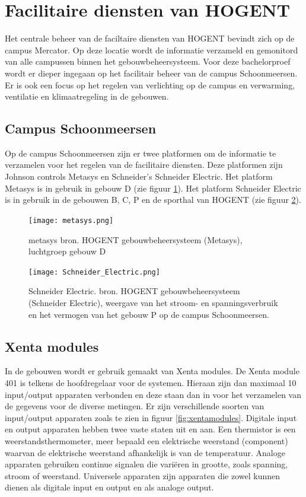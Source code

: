 \section{Facilitaire diensten van HOGENT}
Het centrale beheer van de faciltaire diensten van HOGENT bevindt zich op de campus Mercator. Op deze locatie  wordt de informatie verzameld en gemonitord van alle campussen binnen het gebouwbeheersysteem. Voor deze bachelorproef wordt er dieper ingegaan op het facilitair beheer van de campus Schoonmeersen. Er is ook een focus op het regelen van verlichting op de campus en verwarming, ventilatie en klimaatregeling in de gebouwen.

\subsection{Campus Schoonmeersen}
Op de campus Schoonmeersen zijn er twee platformen om de informatie te verzamelen voor het regelen van de facilitaire diensten. Deze platformen zijn Johnson controls Metasys en Schneider’s Schneider Electric. Het platform Metasys is in gebruik in gebouw D  (zie figuur \ref{fig:metasys}). Het platform Schneider Electric is in gebruik in de gebouwen B, C, P en de sporthal van HOGENT (zie figuur \ref{fig:schneiderelectric})\autocite{Venneman2019}.

\begin{figure}
    \centering
    \texttt{[image: metasys.png]}
    \caption[metasys bron. HOGENT gebouwbeheersysteem (Metasys)]{\label{fig:metasys}metasys bron. HOGENT gebouwbeheersysteem (Metasys), luchtgroep gebouw D}
\end{figure}
\begin{figure}
    \centering
    \texttt{[image: Schneider\_Electric.png]}
    \caption[Schneider Electric. bron. HOGENT gebouwbeheersysteem (Schneider Electric)]{\label{fig:schneiderelectric}Schneider Electric. bron. HOGENT gebouwbeheersysteem (Schneider Electric), weergave van het stroom- en spanningsverbruik en het vermogen van het gebouw P op de campus Schoonmeersen.}
\end{figure}

\subsection{Xenta modules}
In de gebouwen wordt er gebruik gemaakt van Xenta modules. De Xenta module 401 is telkens de hoofdregelaar voor de systemen. Hieraan zijn dan maximaal 10 input/output apparaten verbonden en deze staan dan in voor het verzamelen van de gegevens voor de diverse metingen. Er zijn verschillende soorten van input/output apparaten zoals te zien in figuur \ref{fig:xentamodules}. Digitale input en output apparaten hebben twee vaste staten uit en aan. Een thermistor is een weerstandsthermometer, meer bepaald een elektrische weerstand (component) waarvan de elektrische weerstand afhankelijk is van de temperatuur. \newline \newline
Analoge apparaten gebruiken continue signalen die variëren in grootte, zoals spanning, stroom of weerstand. Universele apparaten zijn apparaten die zowel kunnen dienen als digitale input en output en als analoge output.


